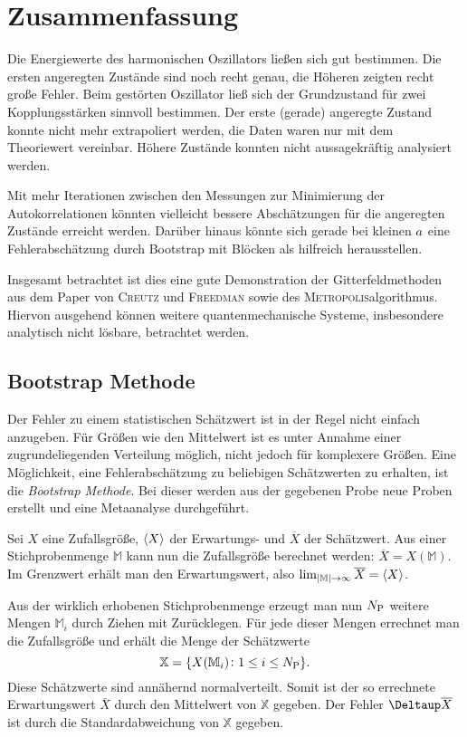\chapter{Zusammenfassung}

Die Energiewerte des harmonischen Oszillators ließen sich gut bestimmen. Die
ersten angeregten Zustände sind noch recht genau, die Höheren zeigten recht
große Fehler. Beim gestörten Oszillator ließ sich der Grundzustand für zwei
Kopplungsstärken sinnvoll bestimmen. Der erste (gerade) angeregte Zustand
konnte nicht mehr extrapoliert werden, die Daten waren nur mit dem Theoriewert
vereinbar. Höhere Zustände konnten nicht aussagekräftig analysiert werden.

Mit mehr Iterationen zwischen den Messungen zur Minimierung der
Autokorrelationen könnten vielleicht bessere Abschätzungen für die angeregten
Zustände erreicht werden. Darüber hinaus könnte sich gerade bei kleinen
$a$ eine Fehlerabschätzung durch Bootstrap mit Blöcken als hilfreich
herausstellen.

Insgesamt betrachtet ist dies eine gute Demonstration der Gitterfeldmethoden
aus dem Paper von \textsc{Creutz} und \textsc{Freedman} sowie des
\textsc{Metropolis}algorithmus. Hiervon ausgehend können weitere
quantenmechanische Systeme, insbesondere analytisch nicht lösbare, betrachtet
werden.

\begin{appendix}
    \chapter{Bootstrap Methode}
    \label{sec:bootstrap}

    Der Fehler zu einem statistischen Schätzwert ist in der Regel nicht einfach
    anzugeben. Für Größen wie den Mittelwert ist es unter Annahme einer
    zugrundeliegenden Verteilung möglich, nicht jedoch für komplexere Größen.
    Eine Möglichkeit, eine Fehlerabschätzung zu beliebigen Schätzwerten zu
    erhalten, ist die \emph{Bootstrap Methode}. Bei dieser werden aus der
    gegebenen Probe neue Proben erstellt und eine Metaanalyse durchgeführt.

    Sei $X$ eine Zufallsgröße, $\langle X \rangle$ der Erwartungs- und $\overline X$
    der Schätzwert. Aus einer Stichprobenmenge $\mathbb M$ kann nun die
    Zufallsgröße berechnet werden: $\overline X = X(\mathbb M)$. Im Grenzwert
    erhält man den Erwartungswert, also $\lim_{|\mathbb M| \to \infty}
    \overline X = \langle X \rangle$.

    Aus der wirklich erhobenen Stichprobenmenge erzeugt man nun
    $N_\text P$ weitere Mengen $\mathbb M_i$ durch Ziehen mit
    Zurücklegen. Für jede dieser Mengen errechnet man die Zufallsgröße und
    erhält die Menge der Schätzwerte
    \[
        \mathbb X = \{ X(\mathbb M_i) \colon 1 \leq i \leq N_\text P \}.
    \]
    Diese Schätzwerte sind annähernd normalverteilt. Somit ist der so
    errechnete Erwartungswert $\overline X$ durch den Mittelwert von $\mathbb
    X$ gegeben. Der Fehler $\Deltaup \overline X$ ist durch die
    Standardabweichung von $\mathbb X$ gegeben.
\end{appendix}

